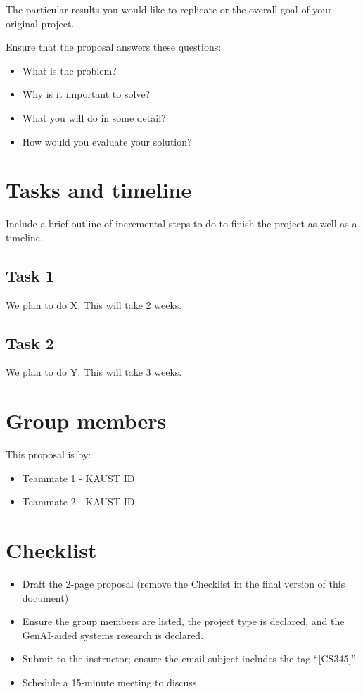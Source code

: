 \documentclass[letterpaper,twocolumn,10pt]{article}
\begin{document}
The particular results you would like to replicate or the overall goal of your original project.

Ensure that the proposal answers these questions:
\begin{itemize}
\item What is the problem?
\item Why is it important to solve?
\item What you will do in some detail?
\item How would you evaluate your solution?
\end{itemize}

\section{Tasks and timeline}

Include a brief outline of incremental steps to do to finish the project as well as a timeline.
\subsection{Task 1}
We plan to do X.
This will take 2 weeks.

\subsection{Task 2}
We plan to do Y.
This will take 3 weeks.

\section*{Group members}

This proposal is by:
\begin{itemize}
  \item Teammate 1 - KAUST ID
  \item Teammate 2 - KAUST ID
\end{itemize}

\section*{Checklist}

\begin{itemize}
  \item Draft the 2-page proposal (remove the Checklist in the final version of this document)
  \item Ensure the group members are listed, the project type is declared, and the GenAI-aided systems research is declared.
  \item Submit to the instructor; ensure the email subject includes the tag ``[CS345]''
  \item Schedule a 15-minute meeting to discuss
\end{itemize}




\end{document}

